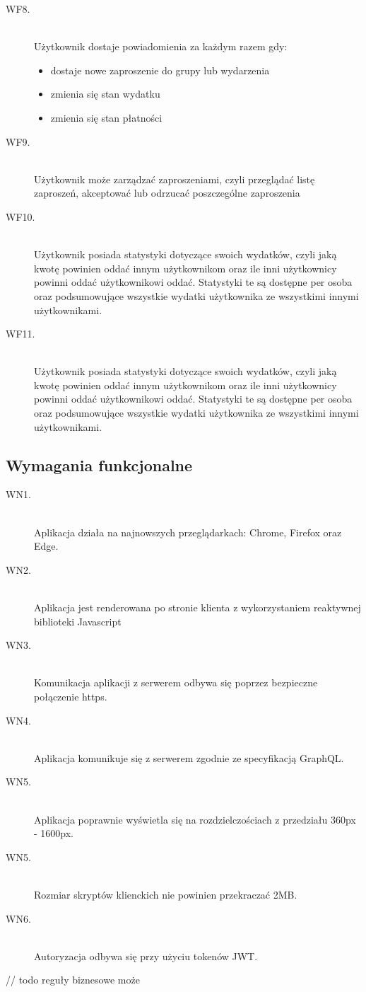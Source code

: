 \begin{description}
  \item[WF8.] \hfill \\ Użytkownik dostaje powiadomienia za każdym razem gdy:
    \begin{itemize}
      \item dostaje nowe zaproszenie do grupy lub wydarzenia
      \item zmienia się stan wydatku
      \item zmienia się stan płatności
    \end{itemize}
  \item[WF9.] \hfill \\ Użytkownik może zarządzać zaproszeniami, czyli przeglądać listę zaproszeń, akceptować lub odrzucać poszczególne zaproszenia
  \item[WF10.] \hfill \\ Użytkownik posiada statystyki dotyczące swoich wydatków, czyli jaką kwotę powinien oddać innym użytkownikom oraz ile inni użytkownicy powinni oddać użytkownikowi oddać. Statystyki te są dostępne per osoba oraz podsumowujące wszystkie wydatki użytkownika ze wszystkimi innymi użytkownikami.
  \item[WF11.] \hfill \\ Użytkownik posiada statystyki dotyczące swoich wydatków, czyli jaką kwotę powinien oddać innym użytkownikom oraz ile inni użytkownicy powinni oddać użytkownikowi oddać. Statystyki te są dostępne per osoba oraz podsumowujące wszystkie wydatki użytkownika ze wszystkimi innymi użytkownikami.

\end{description}

\subsection{Wymagania funkcjonalne}
\begin{description}
  \item[WN1.] \hfill \\ Aplikacja działa na najnowszych przeglądarkach: Chrome, Firefox oraz Edge.
  \item[WN2.] \hfill \\ Aplikacja jest renderowana po stronie klienta z wykorzystaniem reaktywnej biblioteki Javascript
  \item[WN3.] \hfill \\ Komunikacja aplikacji z serwerem odbywa się poprzez bezpieczne połączenie https.
  \item[WN4.] \hfill \\ Aplikacja komunikuje się z serwerem zgodnie ze specyfikacją GraphQL.
  \item[WN5.] \hfill \\ Aplikacja poprawnie wyświetla się na rozdzielczościach z przedziału 360px - 1600px.
  \item[WN5.] \hfill \\ Rozmiar skryptów klienckich nie powinien przekraczać 2MB.
  \item[WN6.] \hfill \\ Autoryzacja odbywa się przy użyciu tokenów JWT.
\end{description}
// todo reguły biznesowe może
